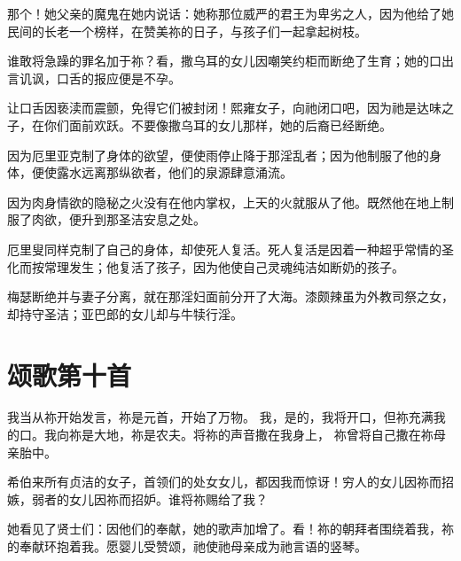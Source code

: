 那个！她父亲的魔鬼在她内说话：她称那位威严的君王为卑劣之人，因为他给了她民间的长老一个榜样，在赞美祢的日子，与孩子们一起拿起树枝。\par

谁敢将急躁的罪名加于祢？看，撒乌耳的女儿因嘲笑约柜而断绝了生育；她的口出言讥讽，口舌的报应便是不孕。\par

让口舌因亵渎而震颤，免得它们被封闭！熙雍女子，向祂闭口吧，因为祂是达味之子，在你们面前欢跃。不要像撒乌耳的女儿那样，她的后裔已经断绝。\par

因为厄里亚克制了身体的欲望，便使雨停止降于那淫乱者；因为他制服了他的身体，便使露水远离那纵欲者，他们的泉源肆意涌流。\par

因为肉身情欲的隐秘之火没有在他内掌权，上天的火就服从了他。既然他在地上制服了肉欲，便升到那圣洁安息之处。\par

厄里叟同样克制了自己的身体，却使死人复活。死人复活是因着一种超乎常情的圣化而按常理发生；他复活了孩子，因为他使自己灵魂纯洁如断奶的孩子。\par

梅瑟断绝并与妻子分离，就在那淫妇面前分开了大海。漆颇辣虽为外教司祭之女，却持守圣洁；亚巴郎的女儿却与牛犊行淫。\par


\section{颂歌第十首}

我当从祢开始发言，祢是元首，开始了万物。 我，是的，我将开口，但祢充满我的口。我向祢是大地，祢是农夫。将祢的声音撒在我身上， 祢曾将自己撒在祢母亲胎中。\par

希伯来所有贞洁的女子，首领们的处女女儿，都因我而惊讶！穷人的女儿因祢而招嫉，弱者的女儿因祢而招妒。谁将祢赐给了我？\par

\par

她看见了贤士们：因他们的奉献，她的歌声加增了。看！祢的朝拜者围绕着我，祢的奉献环抱着我。愿婴儿受赞颂，祂使祂母亲成为祂言语的竖琴。\par

